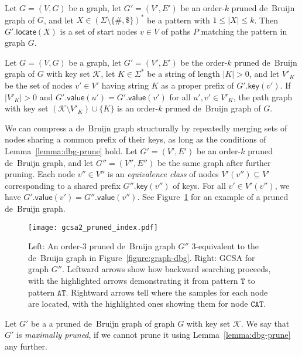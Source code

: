 \documentclass[a4paper,UKenglish]{lipics-v2016}
\newcommand{\set}[1]{\ensuremath{\{ #1 \}}}
\newcommand{\abs}[1]{\ensuremath{\lvert #1 \rvert}}
\newcommand{\dnaseq}[1]{\ensuremath{\mathtt{#1}}}
\newcommand{\locate}{\ensuremath{\mathsf{locate}}}
\newcommand{\gkey}{\ensuremath{\mathsf{key}}}
\newcommand{\gvalue}{\ensuremath{\mathsf{value}}}
\newcommand{\kequivalent}[1]{$#1$\nobreakdash-equivalent}
\newcommand{\orderk}[1]{order\nobreakdash-$#1$}
\newcommand{\patternset}{\ensuremath{(\Sigma \setminus \set{\#, \$})^{\ast}}}
\begin{document}
\begin{lemma}\label{lemma:dbg-fp}
Let $G = (V, G)$ be a graph, let $G' = (V', E')$ be an \orderk{k} pruned de~Bruijn graph of $G$, and let $X \in \patternset$ be a pattern with $1 \le \abs{X} \le k$. Then $G'.\locate(X)$ is a set of start nodes $v\in V$ of paths $P$ matching the pattern in graph $G$.
\end{lemma}

\begin{lemma}[Pruning]\label{lemma:dbg-prune}
Let $G = (V, G)$ be a graph, let $G' = (V', E')$ be the \orderk{k} pruned de~Bruijn graph of $G$ with key set $\mathcal{K}$, let $K \in \Sigma^{\ast}$ be a string of length $\abs{K} > 0$, and let $V'_{K}$ be the set of nodes $v' \in V'$ having string $K$ as a proper prefix of $G'.\gkey(v')$.
If $\abs{V'_{K}} > 0$ and $G'.\gvalue(u') = G'.\gvalue(v')$ for all $u', v' \in V'_{K}$, the path graph with key set $(\mathcal{K} \setminus V'_{K}) \cup \set{K}$ is an \orderk{k} pruned de~Bruijn graph of $G$.
\end{lemma}

We can compress a de~Bruijn graph structurally by repeatedly merging sets of nodes sharing a common prefix of their keys, as long as the conditions of Lemma~\ref{lemma:dbg-prune} hold. Let $G' = (V', E')$ be an \orderk{k} pruned de~Bruijn graph, and let $G'' = (V'', E'')$ be the same graph after further pruning. Each node $v'' \in V''$ is an \emph{equivalence class} of nodes $V'(v'') \subseteq V'$ corresponding to a shared prefix $G''.\gkey(v'')$ of keys. For all $v' \in V'(v'')$, we have $G'.\gvalue(v') = G''.\gvalue(v'')$. See Figure~\ref{figure:pruned-index} for an example of a pruned de~Bruijn graph.

\begin{figure}[t!]
\texttt{[image: gcsa2\_pruned\_index.pdf]}
\caption{Left: An \orderk{3} pruned de~Bruijn graph $G''$ \kequivalent{3} to the de~Bruijn graph in Figure~\ref{figure:graph-dbg}. Right: GCSA for graph $G''$. Leftward arrows show how backward searching proceeds, with the highlighted arrows demonstrating it from pattern $\dnaseq{T}$ to pattern $\dnaseq{AT}$. Rightward arrows tell where the samples for each node are located, with the highlighted ones showing them for node $\dnaseq{CAT}$.}\label{figure:pruned-index}
\end{figure}

\begin{definition}
Let $G'$ be a a pruned de~Bruijn graph of graph $G$ with key set $\mathcal{K}$. We say that $G'$ is \emph{maximally pruned}, if we cannot prune it using Lemma~\ref{lemma:dbg-prune} any further.
\end{definition}
\end{document}
